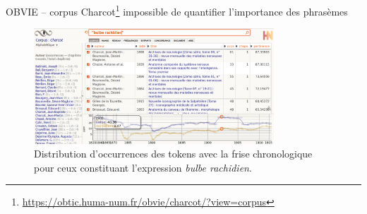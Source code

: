 %
\begin{frame}{OBVIE -- corpus Charcot\footnote{\url{https://obtic.huma-num.fr/obvie/charcot/?view=corpus}}}
\danger{} impossible de quantifier l'importance des phrasèmes
\begin{figure}[!h]
    \centering
\includegraphics[width=90mm,scale=0.5]{pic/bulbe_rachidien.png}
    \caption{Distribution d'occurrences des tokens avec la frise chronologique pour ceux constituant l'expression \textit{bulbe rachidien}.}
    \label{fig:my_label}
\end{figure}
\end{frame}

